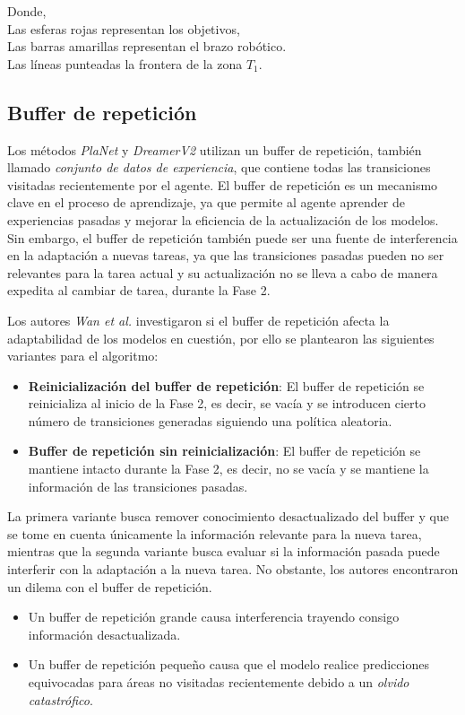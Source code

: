 Donde,\\
Las esferas rojas representan los objetivos,\\
Las barras amarillas representan el brazo robótico.\\
Las líneas punteadas la frontera de la zona $T_1$.

\subsection{Buffer de repetición}\label{subsec:buffer-de-repeticion}
Los métodos \textit{PlaNet} y \textit{DreamerV2} utilizan un buffer de repetición, también llamado \textit{conjunto de datos de experiencia}, que contiene todas las transiciones visitadas recientemente por el agente.
El buffer de repetición es un mecanismo clave en el proceso de aprendizaje, ya que permite al agente aprender de experiencias pasadas y mejorar la eficiencia de la actualización de los modelos.
Sin embargo, el buffer de repetición también puede ser una fuente de interferencia en la adaptación a nuevas tareas, ya que las transiciones pasadas pueden no ser relevantes para la tarea actual y su actualización no se lleva a cabo de manera expedita al cambiar de tarea, durante la Fase 2.

Los autores \textit{Wan et al.} investigaron si el buffer de repetición afecta la adaptabilidad de los modelos en cuestión, por ello se plantearon las siguientes variantes para el algoritmo:

\begin{itemize}
    \item \textbf{Reinicialización del buffer de repetición}: El buffer de repetición se reinicializa al inicio de la Fase 2, es decir, se vacía y se introducen cierto número de transiciones generadas siguiendo una política aleatoria.
    \item \textbf{Buffer de repetición sin reinicialización}: El buffer de repetición se mantiene intacto durante la Fase 2, es decir, no se vacía y se mantiene la información de las transiciones pasadas.
\end{itemize}

La primera variante busca remover conocimiento desactualizado del buffer y que se tome en cuenta únicamente la información relevante para la nueva tarea, mientras que la segunda variante busca evaluar si la información pasada puede interferir con la adaptación a la nueva tarea.
No obstante, los autores encontraron un dilema con el buffer de repetición.

\begin{itemize}
    \item Un buffer de repetición grande causa interferencia trayendo consigo información desactualizada.
    \item Un buffer de repetición pequeño causa que el modelo realice predicciones equivocadas para áreas no visitadas recientemente debido a un \textit{olvido catastrófico}.
\end{itemize}

